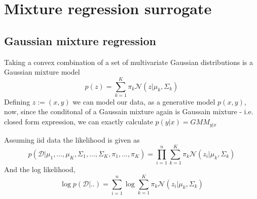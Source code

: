\chapter{Mixture regression surrogate}

\section{Gaussian mixture regression}
Taking a convex combination of a set of multivariate Gaussian distributions is a Gaussian mixture model
$$p(z) = \sum_{k=1}^K \pi_k \mathcal{N}(z|\mu_k, \Sigma_k)$$  
Defining $z := (x,y)$ we can model our data, as a generative model $p(x,y)$, now, since the conditonal 
of a Gaussain mixture again is Gaussain mixture - i.e. closed form expression, we can exactly calculate
$p(y|x) = GMM_{y|x}$

Assuming iid data the likelihood is given as 
$$p(\mathcal{D}|\mu_1, \dots, \mu_K, \Sigma_1, \dots, \Sigma_K, \pi_1, \dots, \pi_K) = \prod_{i=1}^n \sum_{k=1}^K \pi_k \mathcal{N}(z_i|\mu_k, \Sigma_k)$$
And the log likelihood, 
$$\log p(\mathcal{D}| ..) = \sum_{i=1}^n \log \sum_{k=1}^K \pi_k \mathcal{N}(z_i|\mu_k, \Sigma_k)$$


